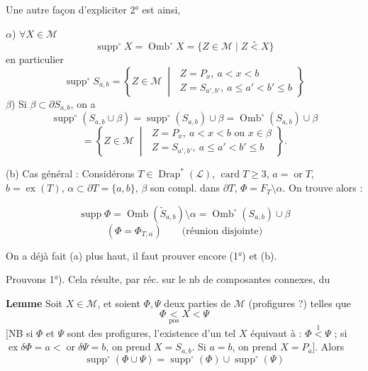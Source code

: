 \documentclass[11pt,a4paper]{article}
\begin{document}
Une autre façon  d'expliciter 2° est ainsi, 

$\alpha$) $\forall X\in\mathcal{M}$
\[ \operatorname{supp}^\circ X = \operatorname{Omb}^\circ X = \{Z\in\mathcal{M} \mid Z \overset{\circ}{<} X\} \]
en particulier
\[ \operatorname{supp}^\circ S_{a,b} = \left\{Z\in\mathcal{M} \;\middle|\;
\begin{array}{l} Z=P_x,\ a<x<b \\ Z=S_{a',b'},\ a\leq a'<b'\leq b \end{array}\right\} \]
$\beta$) Si $\beta\subset\partial S_{a,b}$, on a
\[ \operatorname{supp}^\circ(S_{a,b}\cup\beta) = \operatorname{supp}^\circ(S_{a,b})\cup\beta = \operatorname{Omb}^\circ(S_{a,b})\cup\beta \]
\[ = \left\{Z\in\mathcal{M} \;\middle|\;
\begin{array}{l} Z=P_x,\ a<x<b \text{ ou } x\in\beta \\ Z=S_{a',b'},\ a\leq a'<b'\leq b \end{array}\right\} . \]


(b) Cas général : Considérons $T\in\operatorname{Drap}^*(\mathcal{L})$, $\operatorname{card}T\geq 3$, \struck{$\alpha$} $a=\operatorname{or}T$, $b=\operatorname{ex}(T)$, \struck{$\alpha$} $\alpha\subset\partial T=\{a,b\}$, $\beta$ son compl. dans $\partial T$, $\Phi=F_T\setminus\alpha$. On trouve alors :

\[ \operatorname{supp}\Phi = \operatorname{Omb}(\widetilde{S}_{a,b})\setminus\alpha = \operatorname{Omb}^\circ(S_{a,b})\cup\beta \]
\[ (\Phi = \Phi_{T,\alpha}) \qquad \text{(réunion disjointe)} \]

On a déjà fait (a) plus haut, il faut prouver encore (1°) et (b).

Prouvons 1°). Cela résulte, par réc. sur le nb de composantes connexes, du

\textbf{Lemme} Soit $X\in\mathcal{M}$, et soient $\Phi,\Psi$ deux parties de $\mathcal{M}$ (profigures ?) telles que
\[ \Phi \underset{\mathrm{pos}}{<} X < \Psi \]
[NB si $\Phi$ et $\Psi$ sont des profigures, l'existence d'un tel $X$ équivaut à : $\Phi \overset{1}{<} \Psi$ ; si $\operatorname{ex}\delta\Phi = a < \operatorname{or}\delta\Psi = b$, on prend $X=S_{a,b}$. Si $a=b$, on prend $X=P_a$].
Alors
\[ \operatorname{supp}^\circ(\Phi\cup\Psi) = \operatorname{supp}^\circ(\Phi)\cup\operatorname{supp}^\circ(\Psi) \]
\end{document}
